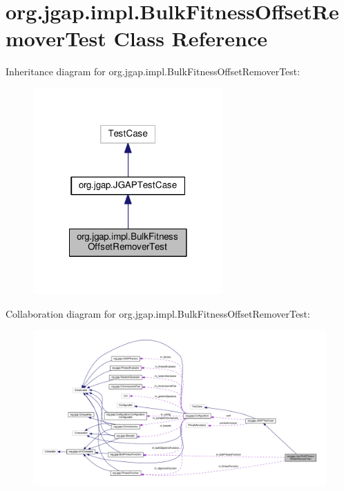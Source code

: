 \hypertarget{classorg_1_1jgap_1_1impl_1_1_bulk_fitness_offset_remover_test}{\section{org.\-jgap.\-impl.\-Bulk\-Fitness\-Offset\-Remover\-Test Class Reference}
\label{classorg_1_1jgap_1_1impl_1_1_bulk_fitness_offset_remover_test}
}


Inheritance diagram for org.\-jgap.\-impl.\-Bulk\-Fitness\-Offset\-Remover\-Test\-:
\nopagebreak
\begin{figure}[H]
\begin{center}
\leavevmode
\includegraphics[width=206pt]{classorg_1_1jgap_1_1impl_1_1_bulk_fitness_offset_remover_test__inherit__graph}
\end{center}
\end{figure}


Collaboration diagram for org.\-jgap.\-impl.\-Bulk\-Fitness\-Offset\-Remover\-Test\-:
\nopagebreak
\begin{figure}[H]
\begin{center}
\leavevmode
\includegraphics[width=350pt]{classorg_1_1jgap_1_1impl_1_1_bulk_fitness_offset_remover_test__coll__graph}
\end{center}
\end{figure}
